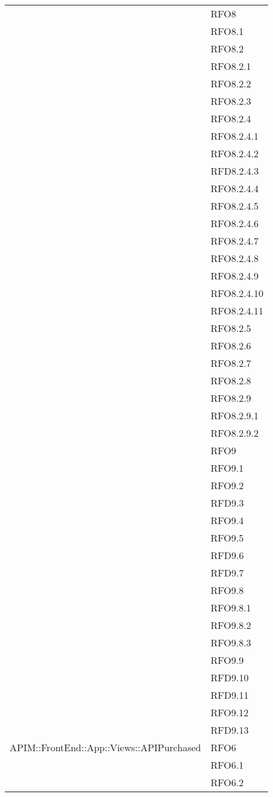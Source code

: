 \begin{longtable}{ p{12cm} | p{4cm} }
			& RFO8 \\
			& RFO8.1 \\
			& RFO8.2 \\
			& RFO8.2.1 \\
			& RFO8.2.2 \\
			& RFO8.2.3 \\
			& RFO8.2.4 \\
			& RFO8.2.4.1 \\
			& RFO8.2.4.2 \\
			& RFD8.2.4.3 \\
			& RFO8.2.4.4 \\
			& RFO8.2.4.5 \\
			& RFO8.2.4.6 \\
			& RFO8.2.4.7 \\
			& RFO8.2.4.8 \\
			& RFO8.2.4.9 \\
			& RFO8.2.4.10 \\
			& RFO8.2.4.11 \\
			& RFO8.2.5 \\
			& RFO8.2.6 \\
			& RFO8.2.7 \\
			& RFO8.2.8 \\
			& RFO8.2.9 \\
			& RFO8.2.9.1 \\
			& RFO8.2.9.2 \\
			& RFO9 \\
			& RFO9.1 \\
			& RFO9.2 \\
			& RFD9.3 \\
			& RFO9.4 \\
			& RFO9.5 \\
			& RFD9.6 \\
			& RFD9.7 \\
			& RFO9.8 \\
			& RFO9.8.1 \\
			& RFO9.8.2 \\
			& RFO9.8.3 \\
			& RFO9.9 \\
			& RFD9.10 \\
			& RFD9.11 \\
			& RFO9.12 \\
			& RFD9.13 \\
			\hline
			APIM::FrontEnd::App::Views::APIPurchased
			& RFO6 \\
			& RFO6.1 \\
			& RFO6.2 \\

\end{longtable}
